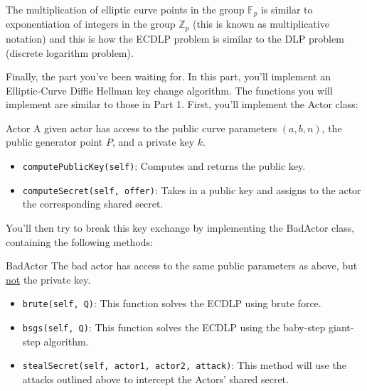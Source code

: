 \documentclass{article}
\begin{document}
The multiplication of elliptic curve points in the group $\mathbb{F}_{p}$ is similar to exponentiation of integers in the group $\mathbb{Z}_{p}$ (this is known as multiplicative notation) and this is how the ECDLP problem is similar to the DLP problem (discrete logarithm problem).




\begin{tcolorbox}[enhanced,interior style={top color=Plum!20,bottom color=Plum!30}]
    Finally, the part you've been waiting for. In this part, you'll implement an Elliptic-Curve Diffie Hellman key change algorithm. The functions you will implement are similar to those in Part 1. First, you'll implement the Actor class:

    \begin{mybox}[
        colframe=Cerulean!50!black,
        colback=Cerulean!30,
        colbacktitle=Cerulean!,
        coltitle=Cerulean!30!black
        ]{Actor}
        A given actor has access to the public curve parameters $(a, b, n)$, the public generator point $P$, and a private key $k$.
        \begin{itemize}
            \item \lstinline{computePublicKey(self)}: Computes and returns the public key.
            \item \lstinline{computeSecret(self, offer)}: Takes in a public key and assigns to the actor the corresponding shared secret.
        \end{itemize}

    \end{mybox}

    You'll then try to break this key exchange by implementing the BadActor class, containing the following methods:

    \begin{mybox}[
        colframe=purple!50!black,
        colback=purple!30,
        colbacktitle=purple!50!white,
        coltitle=purple!30!black,
        ]{BadActor}
        The bad actor has access to the same public parameters as above, but \underline{not} the private key.
        \begin{itemize}
            \item \lstinline{brute(self, Q)}: This function solves the ECDLP using brute force.
            \item \lstinline{bsgs(self, Q)}: This function solves the ECDLP using the baby-step giant-step algorithm.
            \item \lstinline{stealSecret(self, actor1, actor2, attack)}: This method will use the attacks outlined above to intercept the Actors' shared secret.
        \end{itemize}
    \end{mybox}
\end{tcolorbox}
\end{document}
